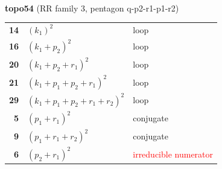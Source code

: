 \documentclass[10pt]{article}
\begin{document}
\begin{minipage}[t]{0.48\textwidth}
{}\\[2mm]\textbf{topo54} (RR family 3, pentagon q-p2-r1-p1-r2)\\[2pt]{\footnotesize\begin{tabular}{@{}r@{\ \ }l@{\ \ }l@{}}\textbf{14} & $(k_1)^2$ & loop\\
\textbf{16} & $(k_1+p_2)^2$ & loop\\
\textbf{20} & $(k_1+p_2+r_1)^2$ & loop\\
\textbf{21} & $(k_1+p_1+p_2+r_1)^2$ & loop\\
\textbf{29} & $(k_1+p_1+p_2+r_1+r_2)^2$ & loop\\
\textbf{5} & $(p_1+r_1)^2$ & conjugate\\
\textbf{9} & $(p_1+r_1+r_2)^2$ & conjugate\\
\textbf{6} & $(p_2+r_1)^2$ & \textcolor{red}{irreducible numerator}\\\end{tabular}}\end{minipage}

\bigskip
\end{document}
